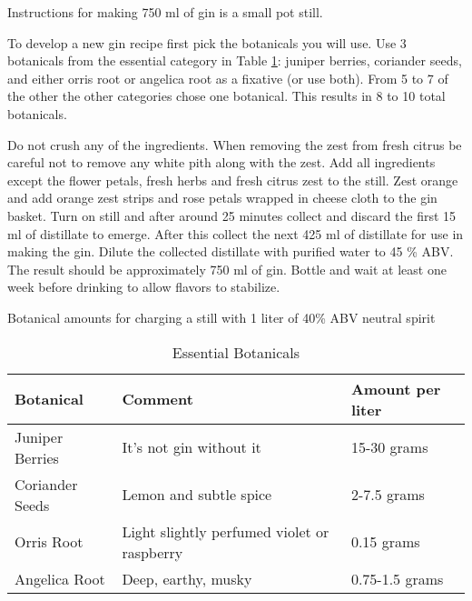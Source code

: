 \documentclass[letterpaper]{recipePMG}
\begin{document}
\newpage


Instructions for making 750 ml of gin is a small pot still.

To develop a new gin recipe first pick the botanicals you will use.  Use 3 botanicals from the essential category in Table \ref{tab:essential}: juniper berries, coriander seeds, and either orris root or angelica root as a fixative (or use both).  From 5 to 7 of the other the other categories chose one botanical. This results in 8 to 10 total botanicals. 

Do not crush any of the ingredients. When removing the zest from fresh citrus be careful not to remove any white pith along with the zest. Add all ingredients except the flower petals, fresh herbs and fresh citrus zest to the still.  Zest orange and add orange zest strips and rose petals wrapped in cheese cloth to the gin basket.  Turn on still and after around 25 minutes collect and discard the first 15 ml of distillate to emerge. After this collect the next 425 ml of distillate for use in making the gin. Dilute the collected distillate with purified water to 45 \% ABV. The result should be approximately 750 ml of gin. Bottle and wait at least one week before drinking to allow flavors to stabilize.

Botanical amounts for charging a still with 1 liter of 40\% ABV neutral spirit



\begin{table}[H]
    \centering
    \caption{Essential Botanicals}
    \begin{tabular}{@{}p{1.25in}p{3in}p{1.25in}@{}}
        \toprule
      Botanical &  Comment & Amount per liter \\
        \midrule
      	Juniper Berries & It's not gin without it & 15-30 grams  \\
 		Coriander Seeds & Lemon and subtle spice  & 2-7.5 grams \\
		Orris Root & Light slightly perfumed violet or raspberry & 0.15 grams \\
		Angelica Root &  Deep, earthy, musky & 0.75-1.5 grams \\
        \bottomrule
    \end{tabular}
    \label{tab:essential}
\end{table}
\end{document}
